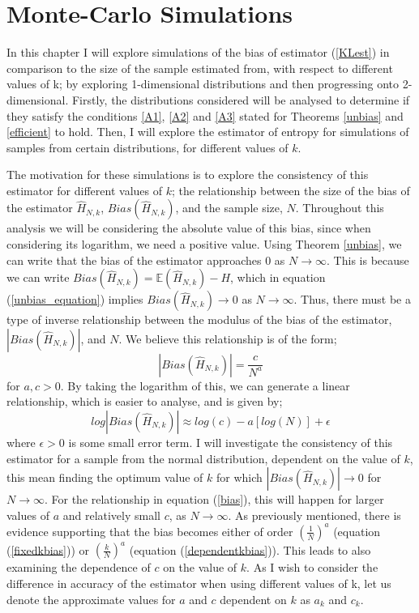 \documentclass{report}
\begin{document}
\chapter{Monte-Carlo Simulations}

In this chapter I will explore simulations of the bias of estimator (\ref{KLest}) in comparison to the size of the sample estimated from, with respect to different values of k; by exploring 1-dimensional distributions and then progressing onto 2-dimensional. Firstly, the distributions considered will be analysed to determine if they satisfy the conditions \ref{A1}, \ref{A2} and \ref{A3} stated for Theorems \ref{unbias} and \ref{efficient} to hold. Then, I will explore the estimator of entropy for simulations of samples from certain distributions, for different values of $k$.

The motivation for these simulations is to explore the consistency of this estimator for different values of $k$; the relationship between the size of the bias of the estimator $\hat{H}_{N, k}$, $Bias(\hat{H}_{N, k})$,  and the sample size, $N$. Throughout this analysis we will be considering the absolute value of this bias, since when considering its logarithm, we need a positive value. Using Theorem \ref{unbias}, we can write that the bias of the estimator approaches 0 as $N \to \infty$. This is because we can write $Bias(\hat{H}_{N, k} ) = \mathbb{E}(\hat{H}_{N, k}) - H$, which in equation (\ref{unbias_equation}) implies $Bias(\hat{H}_{N, k}) \to 0$ as $N \to \infty$. Thus, there must be a type of inverse relationship between the modulus of the bias of the estimator, $|Bias(\hat{H}_{N, k})|$, and $N$. We believe this relationship is of the form;
\begin{equation} \label{bias}
|Bias(\hat{H}_{N, k})| = \frac{c}{N^a}
\end{equation}
for $a, c > 0$. By taking the logarithm of this, we can generate a linear relationship, which is easier to analyse, and is given by;
\begin{equation} \label{logbias}
log|Bias(\hat{H}_{N, k})| \approx log(c) - a [log(N)] + \epsilon
\end{equation}
where $\epsilon > 0$ is some small error term. I will investigate the consistency of this estimator for a sample from the normal distribution, dependent on the value of $k$, this mean finding the optimum value of $k$ for which $|Bias(\hat{H}_{N, k})| \to 0$ for $N \to \infty$. For the relationship in equation (\ref{bias}), this will happen for larger values of $a$ and relatively small $c$, as $N \to \infty$. As previously mentioned, there is evidence supporting that the bias becomes either of order $(\frac{1}{N})^a$ (equation (\ref{fixedkbias})) or $(\frac{k}{N})^a$ (equation (\ref{dependentkbias})). This leads to also examining the dependence of $c$ on the value of $k$. 
As I wish to consider the difference in accuracy of the estimator when using different values of k, let us denote the approximate values for $a$ and $c$ dependent on $k$ as $a_{k}$ and $c_{k}$.
\end{document}
